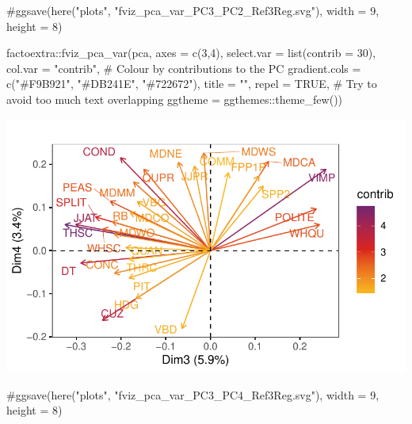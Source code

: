 \documentclass[
  letterpaper,
  DIV=11,
  numbers=noendperiod]{scrreprt}
\newenvironment{Shaded}{\begin{snugshade}}{\end{snugshade}}
\newcommand{\AttributeTok}[1]{\textcolor[rgb]{0.40,0.45,0.13}{#1}}
\newcommand{\CommentTok}[1]{\textcolor[rgb]{0.37,0.37,0.37}{#1}}
\newcommand{\ConstantTok}[1]{\textcolor[rgb]{0.56,0.35,0.01}{#1}}
\newcommand{\DecValTok}[1]{\textcolor[rgb]{0.68,0.00,0.00}{#1}}
\newcommand{\FunctionTok}[1]{\textcolor[rgb]{0.28,0.35,0.67}{#1}}
\newcommand{\NormalTok}[1]{\textcolor[rgb]{0.00,0.23,0.31}{#1}}
\newcommand{\SpecialCharTok}[1]{\textcolor[rgb]{0.37,0.37,0.37}{#1}}
\newcommand{\StringTok}[1]{\textcolor[rgb]{0.13,0.47,0.30}{#1}}
\begin{document}
\begin{Shaded}
\begin{Highlighting}[]
\CommentTok{\#ggsave(here("plots", "fviz\_pca\_var\_PC3\_PC2\_Ref3Reg.svg"), width = 9, height = 8)}

\NormalTok{factoextra}\SpecialCharTok{::}\FunctionTok{fviz\_pca\_var}\NormalTok{(pca,}
             \AttributeTok{axes =} \FunctionTok{c}\NormalTok{(}\DecValTok{3}\NormalTok{,}\DecValTok{4}\NormalTok{),}
             \AttributeTok{select.var =} \FunctionTok{list}\NormalTok{(}\AttributeTok{contrib =} \DecValTok{30}\NormalTok{),}
             \AttributeTok{col.var =} \StringTok{"contrib"}\NormalTok{, }\CommentTok{\# Colour by contributions to the PC}
             \AttributeTok{gradient.cols =} \FunctionTok{c}\NormalTok{(}\StringTok{"\#F9B921"}\NormalTok{, }\StringTok{"\#DB241E"}\NormalTok{, }\StringTok{"\#722672"}\NormalTok{),}
             \AttributeTok{title =} \StringTok{""}\NormalTok{,}
             \AttributeTok{repel =} \ConstantTok{TRUE}\NormalTok{, }\CommentTok{\# Try to avoid too much text overlapping}
             \AttributeTok{ggtheme =}\NormalTok{ ggthemes}\SpecialCharTok{::}\FunctionTok{theme\_few}\NormalTok{())}
\end{Highlighting}
\end{Shaded}

\includegraphics{AppendixH_files/figure-pdf/graphs-of-variables-3.pdf}

\begin{Shaded}
\begin{Highlighting}[]
\CommentTok{\#ggsave(here("plots", "fviz\_pca\_var\_PC3\_PC4\_Ref3Reg.svg"), width = 9, height = 8)}
\end{Highlighting}
\end{Shaded}
\end{document}
